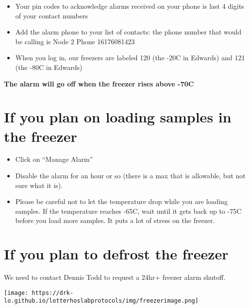 \documentclass[
  letterpaper,
  DIV=11,
  numbers=noendperiod]{scrreprt}
\begin{document}
\begin{itemize}
\item
  Your pin codes to acknowledge alarms received on your phone is last 4
  digits of your contact numbers
\item
  Add the alarm phone to your list of contacts: the phone number that
  would be calling is Node 2 Phone 16176081423
\item
  When you log in, our freezers are labeled 120 (the -20C in Edwards)
  and 121 (the -80C in Edwards)
\end{itemize}

\textbf{The alarm will go off when the freezer rises above -70C}

\hypertarget{if-you-plan-on-loading-samples-in-the-freezer}{%
\section*{\texorpdfstring{\textbf{If you plan on loading samples in the
freezer}}{If you plan on loading samples in the freezer}}\label{if-you-plan-on-loading-samples-in-the-freezer}}

\begin{itemize}
\item
  Click on ``Manage Alarm''
\item
  Disable the alarm for an hour or so (there is a max that is allowable,
  but not sure what it is).
\item
  Please be careful not to let the temperature drop while you are
  loading samples. If the temperature reaches -65C, wait until it gets
  back up to -75C before you load more samples. It puts a lot of stress
  on the freezer.
\end{itemize}

\hypertarget{if-you-plan-to-defrost-the-freezer}{%
\section*{\texorpdfstring{\textbf{If you plan to defrost the
freezer}}{If you plan to defrost the freezer}}\label{if-you-plan-to-defrost-the-freezer}}

We need to contact Dennis Todd to request a 24hr+ freezer alarm shutoff.

\texttt{[image: https://drk-lo.github.io/lotterhoslabprotocols/img/freezerimage.png]}
\end{document}
